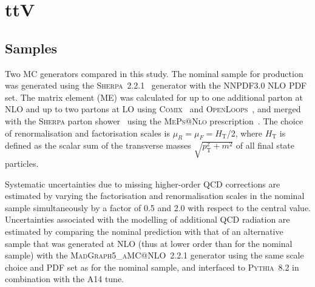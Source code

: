 \section{ttV}
\label{sec:ttV}


\subsection{Samples}
Two MC generators compared in this study.
The nominal sample for \ttW production was generated using the \textsc{Sherpa}~2.2.1~\cite{sherpa} generator with the NNPDF3.0 NLO PDF set.
The matrix element (ME) was calculated for up to one additional parton at NLO and up to two partons at LO using
\textsc{Comix}~\cite{Gleisberg:2008fv} and \textsc{OpenLoops}~\cite{Cascioli:2011va}, and merged with the \textsc{Sherpa} parton shower~\cite{Schumann:2007mg} using the \textsc{MePs@Nlo} prescription~\cite{Hoeche:2012yf}.
The choice of renormalisation and factorisation scales is $\mu_R = \mu_F = H_\textrm{T}$/2, where $H_\textrm{T}$ is defined as the scalar sum of the transverse masses $\sqrt{p_\textrm{T}^2+m^2}$ of all final state particles.



Systematic uncertainties due to missing higher-order QCD corrections are estimated by varying the factorisation and renormalisation scales in the nominal sample simultaneously by a factor of 0.5 and 2.0 with respect to the central value. 
Uncertainties associated with the modelling of additional QCD radiation are estimated by comparing the nominal \ttW prediction with that of an alternative sample that was generated at NLO (thus at lower order than for the nominal sample) with the \textsc{MadGraph5\_aMC@NLO}~2.2.1 generator using the same scale choice and PDF set as for the nominal sample, and interfaced to \textsc{Pythia}~8.2 in combination with the A14 tune. 


